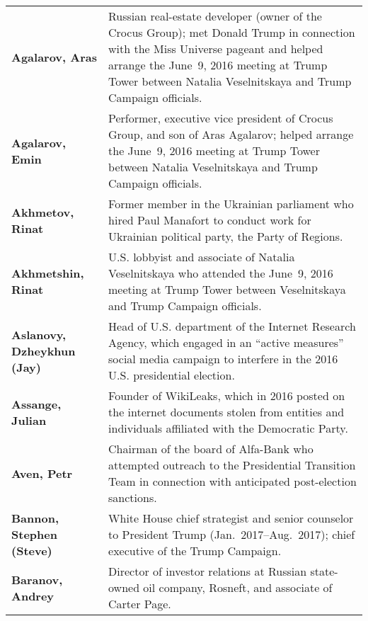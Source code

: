 \begin{longtable}{ p{} p{} }

    \textbf{Agalarov, Aras} & Russian real-estate developer (owner of the Crocus Group); met Donald Trump in connection with the Miss Universe pageant and helped arrange the June~9, 2016 meeting at Trump Tower between Natalia Veselnitskaya and Trump Campaign officials. \\

    \textbf{Agalarov, Emin} & Performer, executive vice president of Crocus Group, and son of Aras Agalarov; helped arrange the June~9, 2016 meeting at Trump Tower between Natalia Veselnitskaya and Trump Campaign officials. \\

    \textbf{Akhmetov, Rinat} & Former member in the Ukrainian parliament who hired Paul Manafort to conduct work for Ukrainian political party, the Party of Regions. \\

    \textbf{Akhmetshin, Rinat} & U.S. lobbyist and associate of Natalia Veselnitskaya who attended the June~9, 2016 meeting at Trump Tower between Veselnitskaya and Trump Campaign officials. \\

    \textbf{Aslanovy, Dzheykhun (Jay)} & Head of U.S. department of the Internet Research Agency, which engaged in an ``active measures'' social media campaign to interfere in the 2016 U.S. presidential election. \\

    \textbf{Assange, Julian} & Founder of WikiLeaks, which in 2016 posted on the internet documents stolen from entities and individuals affiliated with the Democratic Party. \\

    \textbf{Aven, Petr} & Chairman of the board of Alfa-Bank who attempted outreach to the Presidential Transition Team in connection with anticipated post-election sanctions. \\

    \textbf{Bannon, Stephen (Steve)} & White House chief strategist and senior counselor to President Trump (Jan.~2017--Aug.~2017); chief executive of the Trump Campaign. \\

    \textbf{Baranov, Andrey} & Director of investor relations at Russian state-owned oil company, Rosneft, and associate of Carter Page. \\


\end{longtable}
